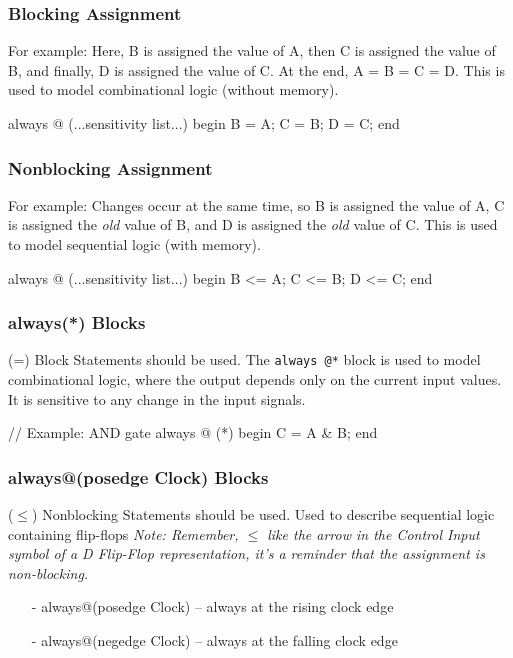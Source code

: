 \documentclass[12pt,openany]{book}
\begin{document}
\subsubsection{Blocking Assignment}
For example:
Here, B is assigned the value of A, then C is assigned the value of B, and finally, D is assigned the value of C. At the end, A = B = C = D.
This is used to model combinational logic (without memory).
\begin{vhdl}
always @ (...sensitivity list...)
begin
	B = A;
	C = B;
	D = C;
end
\end{vhdl}	
\subsubsection{Nonblocking Assignment}

For example:
Changes occur at the same time, so B is assigned the value of A, C is assigned the \textit{old} value of B, and D is assigned the \textit{old} value of C.
This is used to model sequential logic (with memory).
\begin{vhdl}
always @ (...sensitivity list...)
begin
	B <= A;
	C <= B;
	D <= C;
end
\end{vhdl}

\subsubsection{always(*) Blocks} 
(=) Block Statements should be used. \newline
The \texttt{always @*} block is used to model combinational logic, where the output depends only on the current input values. It is sensitive to any change in the input signals.
\begin{vhdl}
// Example: AND gate
always @ (*)
begin
	C = A & B;
end
\end{vhdl}
\vspace*{-10px}
\subsubsection{always@(posedge Clock) Blocks}
($\leq$) Nonblocking Statements should be used. \newline
Used to describe sequential logic containing flip-flops \newline
\textit{Note: Remember, $\leq$ like the arrow in the Control Input symbol of a D Flip-Flop representation, it's a reminder that the assignment is non-blocking.}
\begin{itemize}
	\item[-] always@(posedge Clock) – always at the rising clock edge
	\item[-] always@(negedge Clock) – always at the falling clock edge
\end{itemize}
\vspace*{5px}
\end{document}

